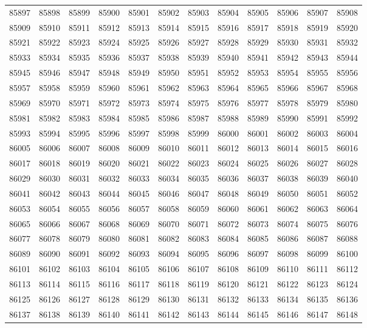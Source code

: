 \begin{center}
\begin{longtable}{llllllllllll}
85897 &85898 &85899 &85900 &85901 &85902 &85903 &85904 &85905 &85906 &85907 &85908 \\
85909 &85910 &85911 &85912 &85913 &85914 &85915 &85916 &85917 &85918 &85919 &85920 \\
85921 &85922 &85923 &85924 &85925 &85926 &85927 &85928 &85929 &85930 &85931 &85932 \\
85933 &85934 &85935 &85936 &85937 &85938 &85939 &85940 &85941 &85942 &85943 &85944 \\
85945 &85946 &85947 &85948 &85949 &85950 &85951 &85952 &85953 &85954 &85955 &85956 \\
85957 &85958 &85959 &85960 &85961 &85962 &85963 &85964 &85965 &85966 &85967 &85968 \\
85969 &85970 &85971 &85972 &85973 &85974 &85975 &85976 &85977 &85978 &85979 &85980 \\
85981 &85982 &85983 &85984 &85985 &85986 &85987 &85988 &85989 &85990 &85991 &85992 \\
85993 &85994 &85995 &85996 &85997 &85998 &85999 &86000 &86001 &86002 &86003 &86004 \\
86005 &86006 &86007 &86008 &86009 &86010 &86011 &86012 &86013 &86014 &86015 &86016 \\
86017 &86018 &86019 &86020 &86021 &86022 &86023 &86024 &86025 &86026 &86027 &86028 \\
86029 &86030 &86031 &86032 &86033 &86034 &86035 &86036 &86037 &86038 &86039 &86040 \\
86041 &86042 &86043 &86044 &86045 &86046 &86047 &86048 &86049 &86050 &86051 &86052 \\
86053 &86054 &86055 &86056 &86057 &86058 &86059 &86060 &86061 &86062 &86063 &86064 \\
86065 &86066 &86067 &86068 &86069 &86070 &86071 &86072 &86073 &86074 &86075 &86076 \\
86077 &86078 &86079 &86080 &86081 &86082 &86083 &86084 &86085 &86086 &86087 &86088 \\
86089 &86090 &86091 &86092 &86093 &86094 &86095 &86096 &86097 &86098 &86099 &86100 \\
86101 &86102 &86103 &86104 &86105 &86106 &86107 &86108 &86109 &86110 &86111 &86112 \\
86113 &86114 &86115 &86116 &86117 &86118 &86119 &86120 &86121 &86122 &86123 &86124 \\
86125 &86126 &86127 &86128 &86129 &86130 &86131 &86132 &86133 &86134 &86135 &86136 \\
86137 &86138 &86139 &86140 &86141 &86142 &86143 &86144 &86145 &86146 &86147 &86148 \\

\end{longtable}
\end{center}

